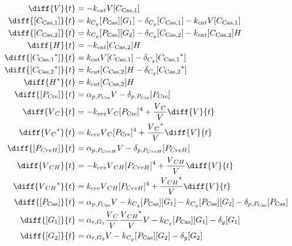 \begin{align}
\diff{\vectorGen{}}{t} & = - \casCutRate{{}}\vectorGen{}\conc{\cplx{\cas}{1}}\\
\diff{\conc{\cplx{\cas}{1}}}{t} & =  \gRnaBind{}\conc{\proSp{\cas{}}}\conc{\gRna{1}} - \casCompDegradeRate{}\conc{\cplx{\cas}{1}} - \casCutRate{{}}\vectorGen{}\conc{\cplx{\cas}{1}}\\
\diff{\conc{\cplx{\cas}{2}}}{t} & =  \gRnaBind{}\conc{\proSp{\cas{}}}\conc{\gRna{2}} - \casCompDegradeRate{}\conc{\cplx{\cas}{2}} - \casCutRate{{}}\conc{\cplx{\cas}{2}}\hostGen{}\\
\diff{\hostGen{}}{t} & = - \casCutRate{{}}\conc{\cplx{\cas}{2}}\hostGen{}\\
\diff{\conc{\bound{\cplx{\cas}{1}}}}{t} & =  \casCutRate{{}}\vectorGen{}\conc{\cplx{\cas}{1}} - \casCompDegradeRate{}\conc{\bound{\cplx{\cas}{1}}}\\
\diff{\conc{\bound{\cplx{\cas}{2}}}}{t} & =  \casCutRate{{}}\conc{\cplx{\cas}{2}}\hostGen{} - \casCompDegradeRate{}\conc{\bound{\cplx{\cas}{2}}}\\
\diff{\edited{\hostGen{}}}{t} & =  \casCutRate{{}}\conc{\cplx{\cas}{2}}\hostGen{}\\
\diff{\conc{\proSp{\cre{}}}}{t} & =  \txtlRate{\proSp{\cre{}}}\vectorGen{} - \proDegradeRate{\proSp{\cre{}}}\conc{\proSp{\cre{}}}\\
\diff{\vectorGen{}_C}{t} & = - \creCutRate{} \vectorGen{}_C \conc{\proSp{\cre{}}}^4 + \frac{\vectorGen{}_C}{\vectorGen{}} \diff{\vectorGen{}}{t}\\
\diff{\edited{\vectorGen{}_C}}{t} & =  \creCutRate{} \vectorGen{}_C \conc{\proSp{\cre{}}}^4 + \frac{\edited{\vectorGen{}_C}}{\vectorGen{}} \diff{\vectorGen{}}{t}\\
\diff{\conc{\proSp{CreH}}}{t} & =  \txtlRate{\proSp{CreH}}\vectorGen{} - \proDegradeRate{\proSp{CreH}}\conc{\proSp{CreH}}\\
\diff{\vectorGen{}_{CH}}{t} & = - \creCutRate{} \vectorGen{}_{CH} \conc{\proSp{CreH}}^4 + \frac{\vectorGen{}_{CH}}{\vectorGen{}} \diff{\vectorGen{}}{t}\\
\diff{\edited{\vectorGen{}_{CH}}}{t} & =  \creCutRate{} \vectorGen{}_{CH} \conc{\proSp{CreH}}^4 + \frac{\edited{\vectorGen{}_{CH}}}{\vectorGen{}} \diff{\vectorGen{}}{t}\\
\diff{\conc{\proSp{\cas{}}}}{t} & =  \txtlRate{\proSp{\cas{}}}\vectorGen{} - \gRnaBind{}\conc{\proSp{\cas{}}}\conc{\gRna{1}} - \gRnaBind{}\conc{\proSp{\cas{}}}\conc{\gRna{2}} - \proDegradeRate{\proSp{\cas{}}}\conc{\proSp{\cas{}}}\\
\diff{\conc{\gRna{1}}}{t} & =  \txRate{\gRna{1}}\frac{\vectorGen{}_C}{\vectorGen{}}\frac{\edited{\vectorGen{}_{CH}}}{\vectorGen{}}\vectorGen{} - \gRnaBind{}\conc{\proSp{\cas{}}}\conc{\gRna{1}} - \rnaDegradeRate{}\conc{\gRna{1}}\\
\diff{\conc{\gRna{2}}}{t} & =  \txRate{\gRna{2}}\vectorGen{} - \gRnaBind{}\conc{\proSp{\cas{}}}\conc{\gRna{2}} - \rnaDegradeRate{}\conc{\gRna{2}}
\end{align}

